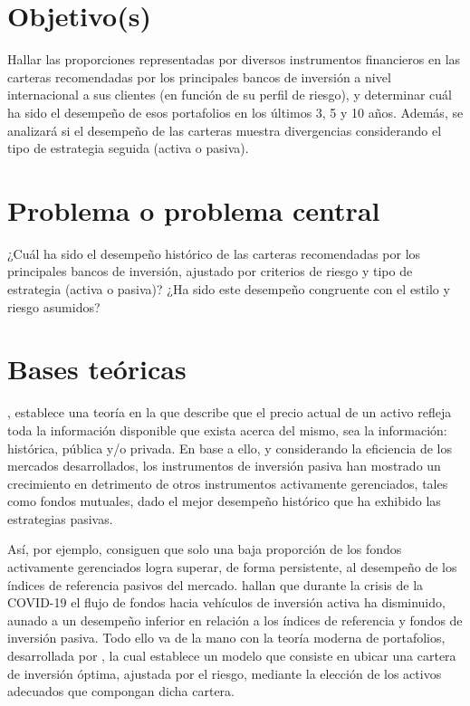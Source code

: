 \section{Objetivo(s)}
Hallar las proporciones representadas por diversos instrumentos financieros en las
carteras recomendadas por los principales bancos de inversión a nivel internacional a sus clientes (en
función de su perfil de riesgo), y determinar cuál ha sido el desempeño de esos portafolios en los
últimos 3, 5 y 10 años. Además, se analizará si el desempeño de las carteras muestra divergencias
considerando el tipo de estrategia seguida (activa o pasiva).

\section{Problema o problema central} 
¿Cuál ha sido el desempeño histórico de las carteras recomendadas
por los principales bancos de inversión, ajustado por criterios de riesgo y tipo de estrategia (activa o
pasiva)? ¿Ha sido este desempeño congruente con el estilo y riesgo asumidos?

\section{Bases teóricas} 
\cite{fama1970}, establece una teoría en la que describe que el precio actual de
un activo refleja toda la información disponible que exista acerca del mismo, sea la información:
histórica, pública y/o privada. En base a ello, y considerando la eficiencia de los mercados
desarrollados, los instrumentos de inversión pasiva han mostrado un crecimiento en detrimento de
otros instrumentos activamente gerenciados, tales como fondos mutuales, dado el mejor desempeño
histórico que ha exhibido las estrategias pasivas.

Así, por ejemplo, \cite{Chan1999} consiguen que solo una baja proporción de los
fondos activamente gerenciados logra superar, de forma persistente, al desempeño de los índices de
referencia pasivos del mercado. \cite{Pastor2020} hallan que durante la crisis de la COVID-19 el
flujo de fondos hacia vehículos de inversión activa ha disminuido, aunado a un desempeño inferior en
relación a los índices de referencia y fondos de inversión pasiva. Todo ello va de la mano con la teoría
moderna de portafolios, desarrollada por \cite{Markowitz1952}, la cual establece un modelo que consiste
en ubicar una cartera de inversión óptima, ajustada por el riesgo, mediante la elección de los activos
adecuados que compongan dicha cartera.

